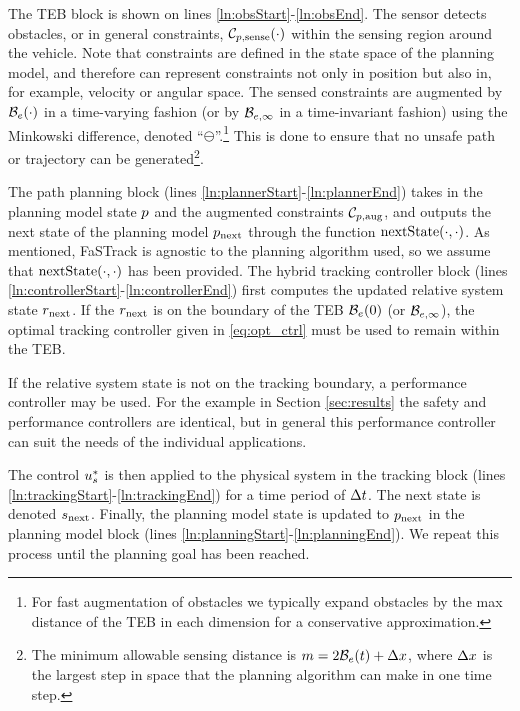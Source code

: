 The TEB block is shown on lines \ref{ln:obsStart}-\ref{ln:obsEnd}. 
The sensor detects obstacles, or in general constraints, $\mathcal C_{p,\text{sense}}(\cdot)$ within the sensing region around the vehicle.
Note that constraints are defined in the state space of the planning model, and therefore can represent constraints not only in position but also in, for example, velocity or angular space.
The sensed constraints are augmented by $\mathcal B_e(\cdot)$ in a time-varying fashion (or by $\mathcal B_{e, \infty}$ in a time-invariant fashion) using the Minkowski difference, denoted ``$\ominus$''.\footnote{For fast augmentation of obstacles we typically expand obstacles by the max distance of the TEB in each dimension for a conservative approximation.} 
This is done to ensure that no unsafe path or trajectory can be generated\footnote{The minimum allowable sensing distance is $m = 2\mathcal B_e(t) + \Delta x$, where $\Delta x$ is the largest step in space that the planning algorithm can make in one time step.}.

The path planning block (lines \ref{ln:plannerStart}-\ref{ln:plannerEnd}) takes in the planning model state $p$ and the augmented constraints $\mathcal C_{p,\text{aug}}$, and outputs the next state of the planning model $p_\text{next}$ through the function $\text{nextState}(\cdot, \cdot)$.
As mentioned, FaSTrack is agnostic to the planning algorithm used, so we assume that $\text{nextState}(\cdot, \cdot)$ has been provided.
The hybrid tracking controller block (lines \ref{ln:controllerStart}-\ref{ln:controllerEnd}) first computes the updated relative system state $r_\text{next}$. 
If the $r_\text{next}$ is on the boundary of the TEB $\mathcal B_e(0)$ (or $\mathcal B_{e, \infty}$), the optimal tracking controller given in \eqref{eq:opt_ctrl} must be used to remain within the TEB. 

If the relative system state is not on the tracking boundary, a performance controller may be used. For the example in Section \ref{sec:results} the safety and performance controllers are identical, but in general this performance controller can suit the needs of the individual applications.

The control $u_s^*$ is then applied to the physical system in the tracking block (lines \ref{ln:trackingStart}-\ref{ln:trackingEnd}) for a time period of $\Delta t$. 
The next state is denoted $s_\text{next}$. 
Finally, the planning model state is updated to $p_\text{next}$ in the planning model block (lines \ref{ln:planningStart}-\ref{ln:planningEnd}). 
We repeat this process until the planning goal has been reached.